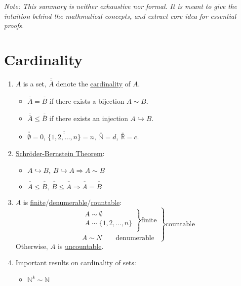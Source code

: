 \documentclass[%
 aip,
 jmp,%
 amsmath,amssymb,
 reprint,%
]{revtex4-1}
\def\R{{\mathbb R}}
\def\N{{\mathbb N}}
\newcommand{\imply}{\Rightarrow}
\newcommand{\defn}[1]{\underline{#1}}
\newcommand{\card}[1]{\overline{\overline{#1}}}
\newcommand{\inject}{\hookrightarrow}
\begin{document}
\emph{Note: This summary is neither exhaustive nor formal.
It is meant to give the intuition behind the mathmatical concepts, and
extract core idea for essential proofs.}

\section{Cardinality}
\begin{enumerate}
  \item $A$ is a set, $\card{A}$ denote the \defn{cardinality} of $A$.
      \begin{itemize}
        \item $\card{A} = \card{B}$ if there exists a bijection $A \sim B$.
        \item $\card{A} \le \card{B}$ if there exists an injection $A \inject B$.
        \item $\card{\emptyset}=0$, $\card{\{1,2,\dots,n\}}=n$, $\card{\N}=d$, $\card{\R}=c$.
      \end{itemize}

  \item \defn{Schr\"oder-Bernstein Theorem}:
    \begin{itemize}
      \item $A \inject B,\ B \inject A \imply A \sim B$
      \item $\card{A} \le \card{B},\ \card{B} \le \card{A} \imply \card{A} = \card{B}$
    \end{itemize}

  \item $A$ is \defn{finite}/\defn{denumerable}/\defn{countable}:
  \[\left.
      \begin{align*}
         &\left.
          \begin{align*}
             A \sim \emptyset \\
             A \sim \{ 1,2,\dots,n \}\\
          \end{align*}
         \right\rbrace\text{finite}\\
          & A \sim N \qquad\textrm{denumerable}
      \end{align*}
  \right\rbrace\text{countable}\]
  Otherwise, $A$ is \defn{uncountable}.

  \item Important results on cardinality of sets:
    \begin{itemize}
      \item $\N^k \sim \N$


\end{itemize}
\end{enumerate}
\end{document}
